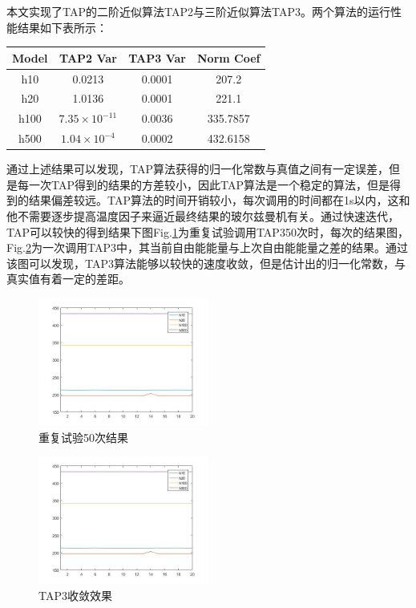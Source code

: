 \documentclass[journal,a4paper]{IEEEtran}
\begin{document}
		本文实现了TAP的二阶近似算法TAP2与三阶近似算法TAP3。两个算法的运行性能结果如下表所示：
		\begin{center}
		\begin{tabular}{c|ccc}
			\hline
			Model & TAP2 Var & TAP3 Var & Norm Coef\\
			\hline
			h10 & 0.0213 & 0.0001 & 207.2 \\
			h20 & 1.0136 & 0.0001 & 221.1 \\
			h100 & $7.35\times 10^{-11}$ & 0.0036 & 335.7857 \\
			h500 & $1.04\times 10^{-4}$ & 0.0002 & 432.6158 \\
			\hline
		\end{tabular}
	\end{center}
		通过上述结果可以发现，TAP算法获得的归一化常数与真值之间有一定误差，但是每一次TAP得到的结果的方差较小，因此TAP算法是一个稳定的算法，但是得到的结果偏差较远。TAP算法的时间开销较小，每次调用的时间都在1s以内，这和他不需要逐步提高温度因子来逼近最终结果的玻尔兹曼机有关。通过快速迭代，TAP可以较快的得到结果下图Fig.\ref{fig4}为重复试验调用TAP350次时，每次的结果图，Fig.\ref{fig5}为一次调用TAP3中，其当前自由能能量与上次自由能能量之差的结果。通过该图可以发现，TAP3算法能够以较快的速度收敛，但是估计出的归一化常数，与真实值有着一定的差距。
		\begin{figure}[h]
			\includegraphics[width=0.5\textwidth]{4.jpg}
			\caption{重复试验50次结果}
			\label{fig4}
		\end{figure}
		\begin{figure}[h]
			\includegraphics[width=0.5\textwidth]{4.jpg}
			\caption{TAP3收敛效果}
			\label{fig5}
		\end{figure}
	
\end{document}

